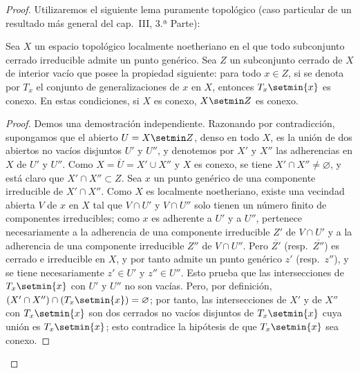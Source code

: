 \begin{proof}
Utilizaremos el siguiente lema puramente topológico (caso particular de un resultado más general del cap.\ III, 3.ª Parte):

\begin{lemma}[15.5.6.1]
\label{IV.15.5.6.1}
Sea $X$ un espacio topológico localmente noetheriano en el que todo subconjunto cerrado irreducible admite un punto genérico.
Sea $Z$ un subconjunto cerrado de $X$ de interior vacío que posee la propiedad siguiente: para todo $x\in Z$, si se denota por $T_x$ el conjunto de generalizaciones de $x$ en $X$, entonces $T_x\setmin\{x\}$ es conexo.
En estas condiciones, si $X$ es conexo, $X\setmin Z$ es conexo.
\end{lemma}

\begin{proof}
Demos una demostración independiente.
Razonando por contradicción, supongamos que el abierto $U=X\setmin Z$, denso en todo $X$, es la unión de dos abiertos no vacíos disjuntos $U'$ y $U''$, y denotemos por $X'$ y $X''$ las adherencias en $X$ de $U'$ y $U''$.
Como $X=\overline{U}=X'\cup X''$ y $X$ es conexo, se tiene $X'\cap X''\ne\varnothing$, y está claro que $X'\cap X''\subset Z$.
Sea $x$ un punto genérico de una componente irreducible de $X'\cap X''$.
Como $X$ es localmente noetheriano, existe una vecindad abierta $V$ de $x$ en $X$ tal que $V\cap U'$ y $V\cap U''$ solo tienen un número finito de componentes irreducibles; como $x$ es adherente a $U'$ y a $U''$, pertenece necesariamente a la adherencia de una componente irreducible $Z'$ de $V\cap U'$ y a la adherencia de una componente irreducible $Z''$ de $V\cap U''$.
Pero $\overline{Z'}$ (resp.\ $\overline{Z''}$) es cerrado e irreducible en $X$, y por tanto admite un punto genérico $z'$ (resp.\ $z''$), y se tiene necesariamente $z'\in U'$ y $z''\in U''$.
Esto prueba que las intersecciones de $T_x\setmin\{x\}$ con $U'$ y $U''$ no son vacías.
Pero, por definición, $(X'\cap X'')\cap(T_x\setmin\{x\})=\varnothing$; por tanto, las intersecciones de $X'$ y de $X''$ con $T_x\setmin\{x\}$ son dos cerrados no vacíos disjuntos de $T_x\setmin\{x\}$ cuya unión es $T_x\setmin\{x\}$; esto contradice la hipótesis de que $T_x\setmin\{x\}$ sea conexo.
\end{proof}
\end{proof}

